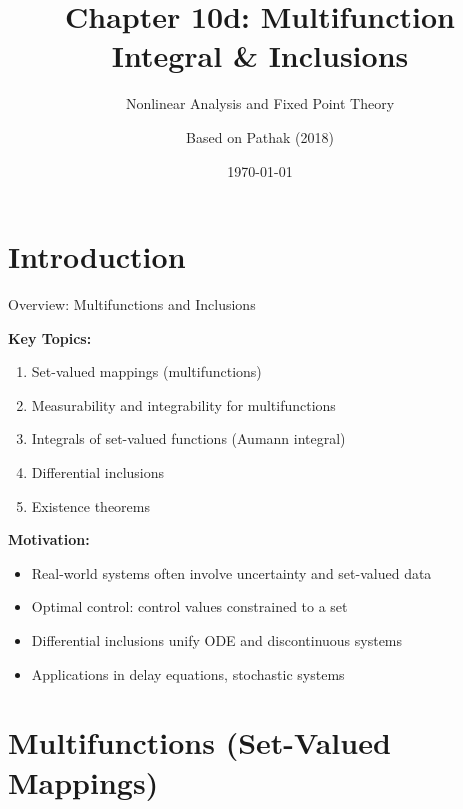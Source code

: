 \documentclass[aspectratio=169,10pt]{beamer}
\title{Chapter 10d: Multifunction Integral \& Inclusions}
\subtitle{Nonlinear Analysis and Fixed Point Theory}
\author{Based on Pathak (2018)}
\date{\today}
\theoremstyle{definition}
\begin{document}
\frame{\titlepage}

\section{Introduction}

\begin{frame}{Overview: Multifunctions and Inclusions}

\textbf{Key Topics:}
\begin{enumerate}
    \item Set-valued mappings (multifunctions)
    \item Measurability and integrability for multifunctions
    \item Integrals of set-valued functions (Aumann integral)
    \item Differential inclusions
    \item Existence theorems
\end{enumerate}

\vspace{0.3cm}

\textbf{Motivation:}
\begin{itemize}
    \item Real-world systems often involve uncertainty and set-valued data
    \item Optimal control: control values constrained to a set
    \item Differential inclusions unify ODE and discontinuous systems
    \item Applications in delay equations, stochastic systems
\end{itemize}

\end{frame}

\section{Multifunctions (Set-Valued Mappings)}
\end{document}

